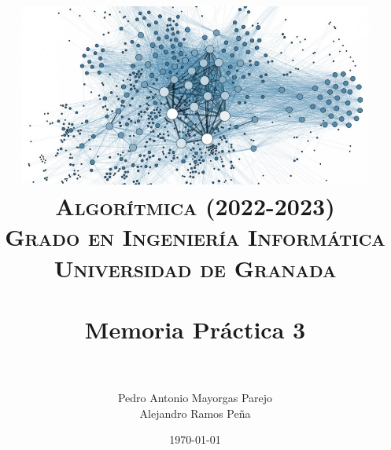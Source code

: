 

\graphicspath{ {img/} }

\title{
\normalfont \normalsize
\includegraphics[width=13cm,height=6cm]{portada}\\
\textsc{\textbf{Algorítmica (2022-2023)} \\ Grado en Ingeniería Informática \\ Universidad de Granada} \\ [25pt] %
\horrule{0.5pt} \\[0.4cm] %
\huge Memoria Práctica 3 \\ %
\horrule{2pt} \\[0.5cm] %
}


\author{Pedro Antonio Mayorgas Parejo  \\  Alejandro Ramos Peña} %

\date{\normalsize\today} %




\maketitle %

\newpage %

